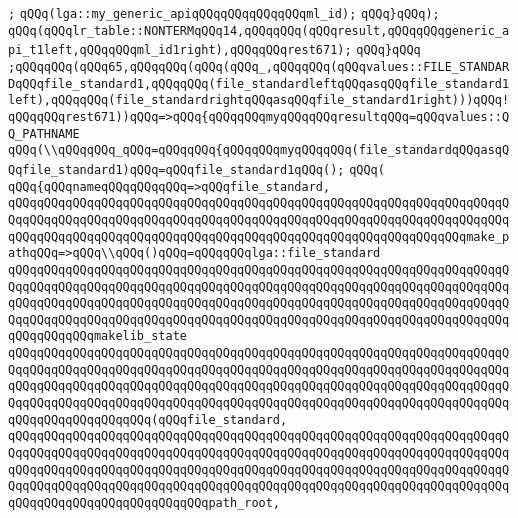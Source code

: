 \verb|;|\newline
\verb|qQQq(lga::my_generic_apiqQQqqQQqqQQqqQQqml_id);|\newline
\verb|qQQq}qQQq);|\newline
\verb|qQQq(qQQqlr_table::NONTERMqQQq14,qQQqqQQq(qQQqresult,qQQqqQQqgeneric_api_t1left,qQQqqQQqml_id1right),qQQqqQQqrest671);|\newline
\verb|qQQq}qQQq|\newline
\verb|;qQQqqQQq(qQQq65,qQQqqQQq(qQQq(qQQq_,qQQqqQQq(qQQqvalues::FILE_STANDARDqQQqfile_standard1,qQQqqQQq(file_standardleftqQQqasqQQqfile_standard1left),qQQqqQQq(file_standardrightqQQqasqQQqfile_standard1right)))qQQq!qQQqqQQqrest671))qQQq=>qQQq{qQQqqQQqmyqQQqqQQqresultqQQq=qQQqvalues::QQ_PATHNAME|\newline
\verb|qQQq(\\qQQqqQQq_qQQq=qQQqqQQq{qQQqqQQqmyqQQqqQQq(file_standardqQQqasqQQqfile_standard1)qQQq=qQQqfile_standard1qQQq();|\newline
\verb|qQQq(|\newline
\verb|qQQq{qQQqnameqQQqqQQqqQQq=>qQQqfile_standard,|\newline
\verb|qQQqqQQqqQQqqQQqqQQqqQQqqQQqqQQqqQQqqQQqqQQqqQQqqQQqqQQqqQQqqQQqqQQqqQQqqQQqqQQqqQQqqQQqqQQqqQQqqQQqqQQqqQQqqQQqqQQqqQQqqQQqqQQqqQQqqQQqqQQqqQQqqQQqqQQqqQQqqQQqqQQqqQQqqQQqqQQqqQQqqQQqqQQqqQQqqQQqqQQqqQQqmake_pathqQQq=>qQQq\\qQQq()qQQq=qQQqqQQqlga::file_standard|\newline
\verb|qQQqqQQqqQQqqQQqqQQqqQQqqQQqqQQqqQQqqQQqqQQqqQQqqQQqqQQqqQQqqQQqqQQqqQQqqQQqqQQqqQQqqQQqqQQqqQQqqQQqqQQqqQQqqQQqqQQqqQQqqQQqqQQqqQQqqQQqqQQqqQQqqQQqqQQqqQQqqQQqqQQqqQQqqQQqqQQqqQQqqQQqqQQqqQQqqQQqqQQqqQQqqQQqqQQqqQQqqQQqqQQqqQQqqQQqqQQqqQQqqQQqqQQqqQQqqQQqqQQqqQQqqQQqqQQqqQQqqQQqqQQqqQQqqQQqmakelib_state|\newline
\verb|qQQqqQQqqQQqqQQqqQQqqQQqqQQqqQQqqQQqqQQqqQQqqQQqqQQqqQQqqQQqqQQqqQQqqQQqqQQqqQQqqQQqqQQqqQQqqQQqqQQqqQQqqQQqqQQqqQQqqQQqqQQqqQQqqQQqqQQqqQQqqQQqqQQqqQQqqQQqqQQqqQQqqQQqqQQqqQQqqQQqqQQqqQQqqQQqqQQqqQQqqQQqqQQqqQQqqQQqqQQqqQQqqQQqqQQqqQQqqQQqqQQqqQQqqQQqqQQqqQQqqQQqqQQqqQQqqQQqqQQqqQQqqQQqqQQqqQQqqQQq(qQQqfile_standard,|\newline
\verb|qQQqqQQqqQQqqQQqqQQqqQQqqQQqqQQqqQQqqQQqqQQqqQQqqQQqqQQqqQQqqQQqqQQqqQQqqQQqqQQqqQQqqQQqqQQqqQQqqQQqqQQqqQQqqQQqqQQqqQQqqQQqqQQqqQQqqQQqqQQqqQQqqQQqqQQqqQQqqQQqqQQqqQQqqQQqqQQqqQQqqQQqqQQqqQQqqQQqqQQqqQQqqQQqqQQqqQQqqQQqqQQqqQQqqQQqqQQqqQQqqQQqqQQqqQQqqQQqqQQqqQQqqQQqqQQqqQQqqQQqqQQqqQQqqQQqqQQqqQQqqQQqqQQqpath_root,|\newline
